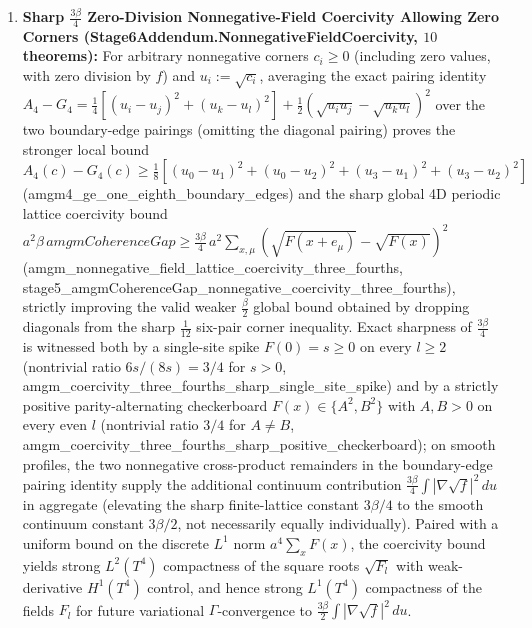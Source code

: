 \documentclass[american,11pt,letterpaper]{article}
\def\mathbb#1{#1}%
\def\mathrm#1{#1}%
\def\texttt#1{#1}%
\begin{document}
\begin{enumerate}[leftmargin=2em]
\begin{equation}
  \left|Q_n(f) - \frac{3\beta}{8}\int_{[0,1]^4}\frac{|\nabla f(u)|^2}{f(u)}\,du\right| \le \frac{\beta\,(B_4/4 + C_2)}{n^2},
  \label{eq:monograph_stage6_torus_conv}
  \end{equation}
  where the continuum integral is nonnegative (strictly positive when $\beta > 0$ and $f$ is nonconstant), confirmed numerically at order $1.990123$ on a 4D all-6-plane profile ($n=8..32$) and $1.999907$ on a 1D cosine profile ($n=32..256$).
  \item \textbf{Sharp $\frac{3\beta}{4}$ Zero-Division Nonnegative-Field Coercivity Allowing Zero Corners (\texttt{Stage6Addendum.\allowbreak{}NonnegativeFieldCoercivity}, $10$ theorems):} For arbitrary nonnegative corners $c_i \ge 0$ (including zero values, with zero division by $f$) and $u_i := \sqrt{c_i}$, averaging the exact pairing identity $A_4 - G_4 = \frac{1}{4}[(u_i-u_j)^2 + (u_k-u_l)^2] + \frac{1}{2}(\sqrt{u_i u_j}-\sqrt{u_k u_l})^2$ over the two boundary-edge pairings (omitting the diagonal pairing) proves the stronger local bound $A_4(c) - G_4(c) \ge \frac{1}{8}[(u_0-u_1)^2+(u_0-u_2)^2+(u_3-u_1)^2+(u_3-u_2)^2]$ (\texttt{amgm4\_\allowbreak{}ge\_\allowbreak{}one\_\allowbreak{}eighth\_\allowbreak{}boundary\_\allowbreak{}edges}) and the sharp global 4D periodic lattice coercivity bound $a^2\beta\,\mathrm{amgmCoherenceGap} \ge \frac{3\beta}{4}\,a^2\sum_{x,\mu}(\sqrt{F(x+e_\mu)}-\sqrt{F(x)})^2$ (\texttt{amgm\_\allowbreak{}nonnegative\_\allowbreak{}field\_\allowbreak{}lattice\_\allowbreak{}coercivity\_\allowbreak{}three\_\allowbreak{}fourths}, \texttt{stage5\_\allowbreak{}amgmCoherenceGap\_\allowbreak{}nonnegative\_\allowbreak{}coercivity\_\allowbreak{}three\_\allowbreak{}fourths}), strictly improving the valid weaker $\frac{\beta}{2}$ global bound obtained by dropping diagonals from the sharp $\frac{1}{12}$ six-pair corner inequality. Exact sharpness of $\frac{3\beta}{4}$ is witnessed both by a single-site spike $F(0)=s \ge 0$ on every $l \ge 2$ (nontrivial ratio $6s/(8s) = 3/4$ for $s > 0$, \texttt{amgm\_\allowbreak{}coercivity\_\allowbreak{}three\_\allowbreak{}fourths\_\allowbreak{}sharp\_\allowbreak{}single\_\allowbreak{}site\_\allowbreak{}spike}) and by a strictly positive parity-alternating checkerboard $F(x)\in\{A^2, B^2\}$ with $A,B>0$ on every even $l$ (nontrivial ratio $3/4$ for $A \ne B$, \texttt{amgm\_\allowbreak{}coercivity\_\allowbreak{}three\_\allowbreak{}fourths\_\allowbreak{}sharp\_\allowbreak{}positive\_\allowbreak{}checkerboard}); on smooth profiles, the two nonnegative cross-product remainders in the boundary-edge pairing identity supply the additional continuum contribution $\frac{3\beta}{4}\int |\nabla\sqrt{f}|^2\,du$ in aggregate (elevating the sharp finite-lattice constant $3\beta/4$ to the smooth continuum constant $3\beta/2$, not necessarily equally individually). Paired with a uniform bound on the discrete $L^1$ norm $a^4\sum_x F(x)$, the coercivity bound yields strong $L^2(\mathbb{T}^4)$ compactness of the square roots $\sqrt{F_l}$ with weak-derivative $H^1(\mathbb{T}^4)$ control, and hence strong $L^1(\mathbb{T}^4)$ compactness of the fields $F_l$ for future variational $\Gamma$-convergence to $\frac{3\beta}{2}\int |\nabla\sqrt{f}|^2\,du$.

\end{enumerate}
\end{document}
